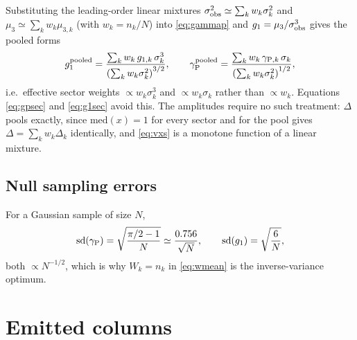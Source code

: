 \documentclass[11pt]{article}
\begin{document}
Substituting the leading-order linear mixtures
$\sigma_{\rm obs}^{2} \simeq \sum_k w_k \sigma_k^{2}$ and
$\mu_3 \simeq \sum_k w_k \mu_{3,k}$ (with $w_k = n_k/N$) into \eqref{eq:gammap} and
$g_1 = \mu_3/\sigma_{\rm obs}^3$ gives the pooled forms
%
\begin{equation}
  g_1^{\rm pooled}
    = \frac{\sum_k w_k\, g_{1,k}\,\sigma_k^{3}}
           {\left(\sum_k w_k \sigma_k^{2}\right)^{3/2}},
  \qquad
  \gamma_{\rm P}^{\rm pooled}
    = \frac{\sum_k w_k\, \gamma_{{\rm P},k}\,\sigma_k}
           {\left(\sum_k w_k \sigma_k^{2}\right)^{1/2}},
  \label{eq:pooledshape}
\end{equation}
%
i.e.\ effective sector weights $\propto w_k \sigma_k^{3}$ and $\propto w_k \sigma_k$
rather than $\propto w_k$. Equations \eqref{eq:gpsec} and \eqref{eq:g1sec} avoid this.
The amplitudes require no such treatment: $\Delta$ pools exactly, since
$\mathrm{med}(x)=1$ for every sector and for the pool gives
$\Delta = \sum_k w_k \Delta_k$ identically, and \eqref{eq:vxs} is a monotone function
of a linear mixture.

\subsection{Null sampling errors}

For a Gaussian sample of size $N$,
%
\begin{equation}
  \mathrm{sd}\!\left(\gamma_{\rm P}\right) = \sqrt{\frac{\pi/2 - 1}{N}}
    \simeq \frac{0.756}{\sqrt{N}},
  \qquad
  \mathrm{sd}\!\left(g_1\right) = \sqrt{\frac{6}{N}},
  \label{eq:nullse}
\end{equation}
%
both $\propto N^{-1/2}$, which is why $W_k = n_k$ in \eqref{eq:wmean} is the
inverse-variance optimum.

\section{Emitted columns}
\end{document}
